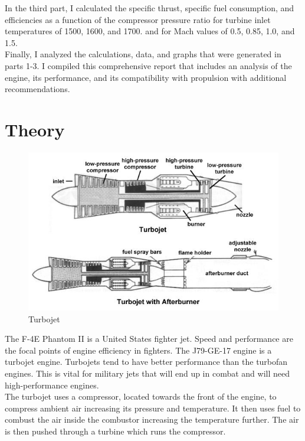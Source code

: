 \documentclass[12pt]{report}
\begin{document}
In the third part, I calculated the specific thrust, specific fuel consumption, and efficiencies as a function of the compressor pressure ratio for turbine inlet temperatures of 1500, 1600, and 1700. and for Mach values of 0.5, 0.85, 1.0, and 1.5.\\

Finally, I analyzed the calculations, data, and graphs that were generated in parts 1-3. I compiled this comprehensive report that includes an analysis of the engine, its performance, and its compatibility with propulsion with additional recommendations.

\chapter{Theory}

\begin{figure}[H]
    \centering
    \includegraphics[width=10.15 cm]{turbojet with afterburner.jpg}
    \caption{Turbojet}
    \label{fig:turbojet}
\end{figure}

The F-4E Phantom II is a United States fighter jet. Speed and performance are the focal points of engine efficiency in fighters. The J79-GE-17 engine is a turbojet engine. Turbojets tend to have better performance than the turbofan engines. This is vital for military jets that will end up in combat and will need high-performance engines.\\

The turbojet uses a compressor, located towards the front of the engine, to compress ambient air increasing its pressure and temperature. It then uses fuel to combust the air inside the combustor increasing the temperature further.  The air is then pushed through a turbine which runs the compressor.\\
\end{document}

